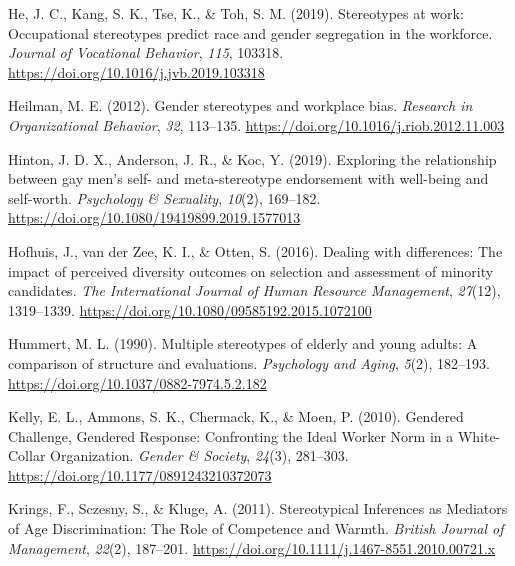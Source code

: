 \documentclass[
  12pt,
  letterpaper,
  DIV=11,
  numbers=noendperiod]{scrartcl}
\newlength{\cslhangindent}
\newlength{\cslentryspacingunit} %
\newenvironment{CSLReferences}[2] %
 {%
  \setlength{\parindent}{0pt}
  \ifodd #1
  \let\oldpar\par
  \def\par{\hangindent=\cslhangindent\oldpar}
  \fi
  \setlength{\parskip}{#2\cslentryspacingunit}
 }%
 {}
\begin{document}
\begin{CSLReferences}{1}{0}
\leavevmode{}%
He, J. C., Kang, S. K., Tse, K., \& Toh, S. M. (2019). Stereotypes at
work: {Occupational} stereotypes predict race and gender segregation in
the workforce. \emph{Journal of Vocational Behavior}, \emph{115},
103318. \url{https://doi.org/10.1016/j.jvb.2019.103318}

\leavevmode{}%
Heilman, M. E. (2012). Gender stereotypes and workplace bias.
\emph{Research in Organizational Behavior}, \emph{32}, 113--135.
\url{https://doi.org/10.1016/j.riob.2012.11.003}

\leavevmode{}%
Hinton, J. D. X., Anderson, J. R., \& Koc, Y. (2019). Exploring the
relationship between gay men's self- and meta-stereotype endorsement
with well-being and self-worth. \emph{Psychology \& Sexuality},
\emph{10}(2), 169--182.
\url{https://doi.org/10.1080/19419899.2019.1577013}

\leavevmode{}%
Hofhuis, J., van der Zee, K. I., \& Otten, S. (2016). Dealing with
differences: The impact of perceived diversity outcomes on selection and
assessment of minority candidates. \emph{The International Journal of
Human Resource Management}, \emph{27}(12), 1319--1339.
\url{https://doi.org/10.1080/09585192.2015.1072100}

\leavevmode{}%
Hummert, M. L. (1990). Multiple stereotypes of elderly and young adults:
{A} comparison of structure and evaluations. \emph{Psychology and
Aging}, \emph{5}(2), 182--193.
\url{https://doi.org/10.1037/0882-7974.5.2.182}

\leavevmode{}%
Kelly, E. L., Ammons, S. K., Chermack, K., \& Moen, P. (2010). Gendered
{Challenge}, {Gendered Response}: {Confronting} the {Ideal Worker Norm}
in a {White-Collar Organization}. \emph{Gender \& Society},
\emph{24}(3), 281--303. \url{https://doi.org/10.1177/0891243210372073}

\leavevmode{}%
Krings, F., Sczesny, S., \& Kluge, A. (2011). Stereotypical {Inferences}
as {Mediators} of {Age Discrimination}: {The Role} of {Competence} and
{Warmth}. \emph{British Journal of Management}, \emph{22}(2), 187--201.
\url{https://doi.org/10.1111/j.1467-8551.2010.00721.x}


\end{CSLReferences}
\end{document}
